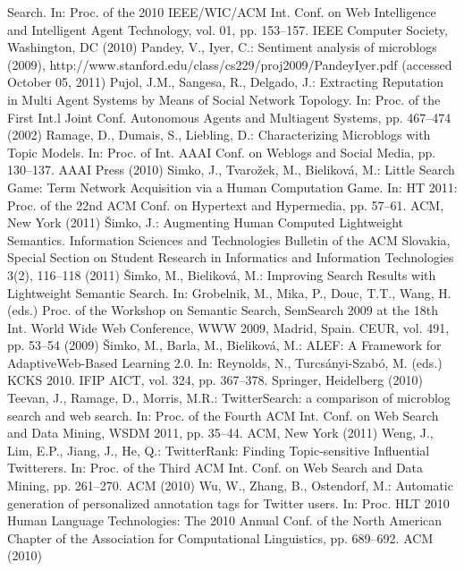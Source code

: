 \documentclass[]{article}
\begin{document}
\begin{thebibliography}{9}
Search. In: Proc. of the 2010 IEEE/WIC/ACM Int. Conf. on Web Intelligence
and Intelligent Agent Technology, vol. 01, pp. 153–157. IEEE Computer Society,
Washington, DC (2010)
Pandey, V., Iyer, C.: Sentiment analysis of microblogs (2009),
http://www.stanford.edu/class/cs229/proj2009/PandeyIyer.pdf (accessed
October 05, 2011)
Pujol, J.M., Sangesa, R., Delgado, J.: Extracting Reputation in Multi Agent Systems
by Means of Social Network Topology. In: Proc. of the First Int.l Joint Conf.
Autonomous Agents and Multiagent Systems, pp. 467–474 (2002)
Ramage, D., Dumais, S., Liebling, D.: Characterizing Microblogs with Topic Models.
In: Proc. of Int. AAAI Conf. on Weblogs and Social Media, pp. 130–137. AAAI
Press (2010)
Simko, J., Tvarožek, M., Bieliková, M.: Little Search Game: Term Network Acquisition
via a Human Computation Game. In: HT 2011: Proc. of the 22nd ACM
Conf. on Hypertext and Hypermedia, pp. 57–61. ACM, New York (2011)
Šimko, J.: Augmenting Human Computed Lightweight Semantics. Information Sciences
and Technologies Bulletin of the ACM Slovakia, Special Section on Student
Research in Informatics and Information Technologies 3(2), 116–118 (2011)
Šimko, M., Bieliková, M.: Improving Search Results with Lightweight Semantic
Search. In: Grobelnik, M., Mika, P., Douc, T.T., Wang, H. (eds.) Proc. of the
Workshop on Semantic Search, SemSearch 2009 at the 18th Int. World Wide Web
Conference, WWW 2009, Madrid, Spain. CEUR, vol. 491, pp. 53–54 (2009)
Šimko, M., Barla, M., Bieliková, M.: ALEF: A Framework for AdaptiveWeb-Based
Learning 2.0. In: Reynolds, N., Turcsányi-Szabó, M. (eds.) KCKS 2010. IFIP AICT,
vol. 324, pp. 367–378. Springer, Heidelberg (2010)
Teevan, J., Ramage, D., Morris, M.R.: TwitterSearch: a comparison of microblog
search and web search. In: Proc. of the Fourth ACM Int. Conf. on Web Search and
Data Mining, WSDM 2011, pp. 35–44. ACM, New York (2011)
Weng, J., Lim, E.P., Jiang, J., He, Q.: TwitterRank: Finding Topic-sensitive Influential
Twitterers. In: Proc. of the Third ACM Int. Conf. on Web Search and Data
Mining, pp. 261–270. ACM (2010)
Wu, W., Zhang, B., Ostendorf, M.: Automatic generation of personalized annotation
tags for Twitter users. In: Proc. HLT 2010 Human Language Technologies:
The 2010 Annual Conf. of the North American Chapter of the Association for
Computational Linguistics, pp. 689–692. ACM (2010)

\end{thebibliography}
\end{document}
